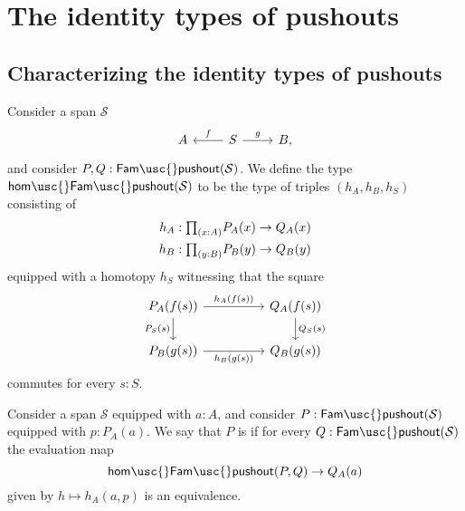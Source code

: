 \section{The identity types of pushouts}

\subsection{Characterizing the identity types of pushouts}

\begin{defn}
  Consider a span $\mathcal{S}$
  \begin{equation*}
    \begin{tikzcd}
      A & S \arrow[l,swap,"f"] \arrow[r,"g"] & B,
    \end{tikzcd}
  \end{equation*}
  and consider $P,Q:\mathsf{Fam\usc{}pushout}(\mathcal{S})$. We define the type $\mathsf{hom\usc{}Fam\usc{}pushout}(\mathcal{S})$ to be the type of triples $(h_A,h_B,h_S)$ consisting of
  \begin{align*}
    h_A & : \prd{x:A} P_A(x)\to Q_A(x) \\
    h_B & : \prd{y:B} P_B(y)\to Q_B(y)
  \end{align*}
  equipped with a homotopy $h_S$ witnessing that the square
  \begin{equation*}
    \begin{tikzcd}[column sep=huge]
      P_A(f(s)) \arrow[r,"h_A(f(s))"] \arrow[d,swap,"P_S(s)"] & Q_A(f(s)) \arrow[d,"Q_S(s)"] \\
      P_B(g(s)) \arrow[r,swap,"h_B(g(s))"] & Q_B(g(s))
    \end{tikzcd}
  \end{equation*}
  commutes for every $s:S$.
\end{defn}

\begin{defn}
  Consider a span $\mathcal{S}$ equipped with $a:A$, and consider
  $P:\mathsf{Fam\usc{}pushout}(\mathcal{S})$ equipped with $p:P_A(a)$. We say that $P$ is  if for every $Q:\mathsf{Fam\usc{}pushout}(\mathcal{S})$ the evaluation map
  \begin{equation*}
    \mathsf{hom\usc{}Fam\usc{}pushout}(P,Q)\to Q_A(a)
  \end{equation*}
  given by $h\mapsto h_A(a,p)$ is an equivalence.
\end{defn}

